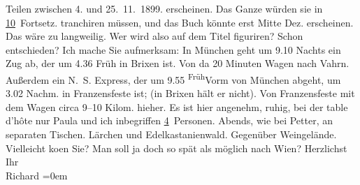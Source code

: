 \begin{ledgroupsized}[t]{13cm}
{{{                  Teilen zwischen 4. und 25. 11. 1899.}}}\label{K_L00973_1h} erscheinen.
               Das Ganze würden sie in \uline{10} Fortsetz. tranchiren
               müssen, und das Buch könnte erst Mitte Dez. erscheinen. Das wäre zu langweilig. Wer
               wird also auf dem Titel figuriren? Schon entschieden? Ich {\pb}mache Sie aufmerksam: In München geht um 9.10 Nachts ein Zug
               ab, der um 4.36 Früh in Brixen ist. Von da 20
               Minuten Wagen nach Vahrn. Außerdem ein N. S. Express, der um
                  9.55{ }\substVorne{}\textsuperscript{Früh}\substDazwischen{}Vorm\substHinten{} von München abgeht, um 3.02
                  Nachm. in Franzensfeste ist;  (in Brixen
               hält er nicht). Von Franzensfeste mit dem Wagen
               circa 9–10 Kilom. hieher. Es ist hier angenehm, ruhig, bei der table d’hôte nur Paula und ich inbegriffen \uline{4} Personen. Abends, wie bei Petter,
               an separaten Tischen. Lärchen und Edelkastanienwald. Gegenüber Weingelände.
               Vielleicht ko{\geminationm}en Sie? Man soll ja doch so spät als
               möglich nach Wien?\pend
           \pstart
           Herzlichst{\\[\baselineskip]}Ihr{\\[\baselineskip]}\spacefill\mbox{Richard}\pend
           \leftskip=0em{}
         
         \endnumbering{}\end{ledgroupsized}  \newcommand{\dateiname}{L00973}\newcommand{\titel}{Richard Beer-Hofmann an Arthur Schnitzler, 12. 9. 1899}\newcommand{\editorInnen}{Martin Anton Müller und Gerd-Hermann Susen}
      